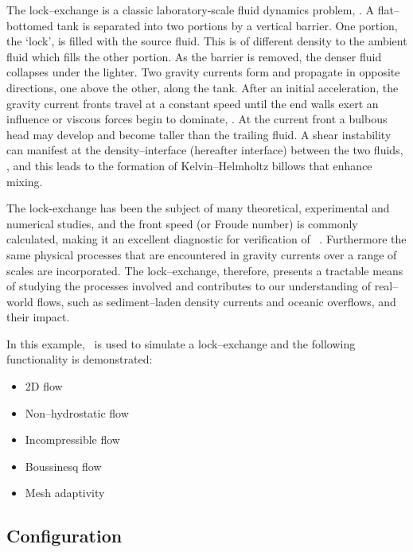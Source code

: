 The lock--exchange is a classic laboratory-scale fluid dynamics problem, \citep{fannelop_94, huppert_06, simpson_87}. A flat--bottomed tank is separated into two portions by a vertical barrier. One portion, the `lock', is filled with the source fluid. This is of different density to the ambient fluid which fills the other portion. As the barrier is removed, the denser fluid collapses under the lighter. Two gravity currents form and propagate in opposite directions, one above the other, along the tank. After an initial acceleration, the gravity current fronts travel at a constant speed until the end walls exert an influence or viscous forces begin to dominate, \citep{cantero_07, hartel_99, huppert_80}. At the current front a bulbous head may develop and become taller than the trailing fluid. A shear instability can manifest at the density--interface (hereafter interface) between the two fluids, \citep{turner_73}, and this leads to the formation of Kelvin--Helmholtz billows that enhance mixing.

The lock-exchange has been the subject of many theoretical, experimental and numerical studies, and the front speed (or Froude number) is commonly calculated, making it an excellent diagnostic for verification of \fluidity\ \citep[e.g.]{benjamin_68, klemp_94, hartel_00}. Furthermore the same physical processes that are encountered in gravity currents over a range of scales are incorporated. The lock--exchange, therefore, presents a tractable means of studying the processes involved and contributes to our understanding of real--world flows, such as sediment--laden density currents and oceanic overflows, and their impact.

In this example, \fluidity\ is used to simulate a lock--exchange and the following functionality is demonstrated:

\begin{itemize}
\item 2D flow
\item Non--hydrostatic flow
\item Incompressible flow
\item Boussinesq flow
\item Mesh adaptivity

\end{itemize}

\subsection{Configuration}
\label{sect:lock_exchange_configuration}

